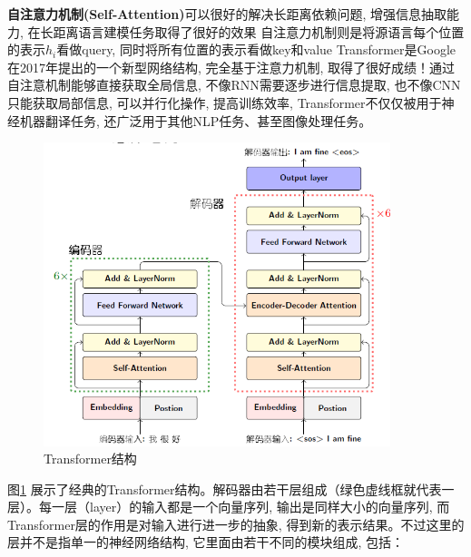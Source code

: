 \documentclass[a4paper]{article}
\newcommand{\parinterval}{\noindent\hspace{2em}}%
\begin{document}
\textbf{自注意力机制(Self-Attention)}可以很好的解决长距离依赖问题, 增强信息抽取能力, 在长距离语言建模任务取得了很好的效果
 自注意力机制则是将源语言每个位置的表示$h_i$看做query, 同时将所有位置的表示看做key和value
 Transformer是Google在2017年提出的一个新型网络结构, 完全基于注意力机制, 取得了很好成绩！通过自注意机制能够直接获取全局信息, 不像RNN需要逐步进行信息提取, 也不像CNN只能获取局部信息, 可以并行化操作, 提高训练效率, Transformer不仅仅被用于神经机器翻译任务, 还广泛用于其他NLP任务、甚至图像处理任务。
\begin{figure}[htp]
    \centering
\includegraphics[width=0.9\textwidth]{Transformer1.png}
    \caption{Transformer结构}
    \label{Transformer}
    \end{figure}
    \parinterval 图\ref{Transformer} 展示了经典的Transformer结构。解码器由若干层组成（绿色虚线框就代表一层）。每一层（layer）的输入都是一个向量序列, 输出是同样大小的向量序列, 而Transformer层的作用是对输入进行进一步的抽象, 得到新的表示结果。不过这里的层并不是指单一的神经网络结构, 它里面由若干不同的模块组成, 包括：
\end{document}
